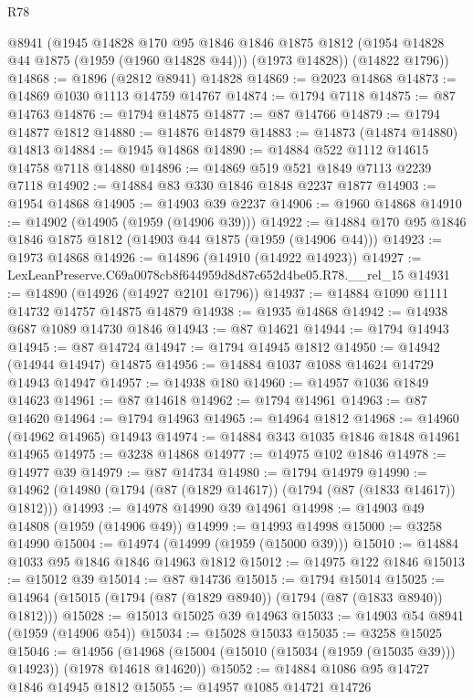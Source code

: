 \begin{lexlean}{R78}
\begin{coremodule}
      @8941
      (@1945
        @14828
        @170
        @95
        @1846
        @1846
        @1875
        @1812
        (@1954 @14828 @44 @1875 (@1959 (@1960 @14828 @44)))
        (@1973 @14828))
      (@14822 @1796))
@14868 := @1896 (@2812 @8941) @14828
@14869 := @2023 @14868
@14873 := @14869 @1030 @1113 @14759 @14767
@14874 := @1794 @7118
@14875 := @87 @14763
@14876 := @1794 @14875
@14877 := @87 @14766
@14879 := @1794 @14877 @1812
@14880 := @14876 @14879
@14883 := @14873 (@14874 @14880) @14813
@14884 := @1945 @14868
@14890 := @14884 @522 @1112 @14615 @14758 @7118 @14880
@14896 := @14869 @519 @521 @1849 @7113 @2239 @7118
@14902 := @14884 @83 @330 @1846 @1848 @2237 @1877
@14903 := @1954 @14868
@14905 := @14903 @39 @2237
@14906 := @1960 @14868
@14910 := @14902 (@14905 (@1959 (@14906 @39)))
@14922 := @14884 @170 @95 @1846 @1846 @1875 @1812 (@14903 @44 @1875 (@1959 (@14906 @44)))
@14923 := @1973 @14868
@14926 := @14896 (@14910 (@14922 @14923))
@14927 := LexLeanPreserve.C69a0078cb8f644959d8d87c652d4be05.R78.__rel_15
@14931 := @14890 (@14926 (@14927 @2101 @1796))
@14937 := @14884 @1090 @1111 @14732 @14757 @14875 @14879
@14938 := @1935 @14868
@14942 := @14938 @687 @1089 @14730 @1846
@14943 := @87 @14621
@14944 := @1794 @14943
@14945 := @87 @14724
@14947 := @1794 @14945 @1812
@14950 := @14942 (@14944 @14947) @14875
@14956 := @14884 @1037 @1088 @14624 @14729 @14943 @14947
@14957 := @14938 @180
@14960 := @14957 @1036 @1849 @14623
@14961 := @87 @14618
@14962 := @1794 @14961
@14963 := @87 @14620
@14964 := @1794 @14963
@14965 := @14964 @1812
@14968 := @14960 (@14962 @14965) @14943
@14974 := @14884 @343 @1035 @1846 @1848 @14961 @14965
@14975 := @3238 @14868
@14977 := @14975 @102 @1846
@14978 := @14977 @39
@14979 := @87 @14734
@14980 := @1794 @14979
@14990 := @14962 (@14980 (@1794 (@87 (@1829 @14617)) (@1794 (@87 (@1833 @14617)) @1812)))
@14993 := @14978 @14990 @39 @14961
@14998 := @14903 @49 @14808 (@1959 (@14906 @49))
@14999 := @14993 @14998
@15000 := @3258 @14990
@15004 := @14974 (@14999 (@1959 (@15000 @39)))
@15010 := @14884 @1033 @95 @1846 @1846 @14963 @1812
@15012 := @14975 @122 @1846
@15013 := @15012 @39
@15014 := @87 @14736
@15015 := @1794 @15014
@15025 := @14964 (@15015 (@1794 (@87 (@1829 @8940)) (@1794 (@87 (@1833 @8940)) @1812)))
@15028 := @15013 @15025 @39 @14963
@15033 := @14903 @54 @8941 (@1959 (@14906 @54))
@15034 := @15028 @15033
@15035 := @3258 @15025
@15046 := @14956
    (@14968 (@15004 (@15010 (@15034 (@1959 (@15035 @39))) @14923)) (@1978 @14618 @14620))
@15052 := @14884 @1086 @95 @14727 @1846 @14945 @1812
@15055 := @14957 @1085 @14721 @14726

\end{coremodule}
\end{lexlean}
